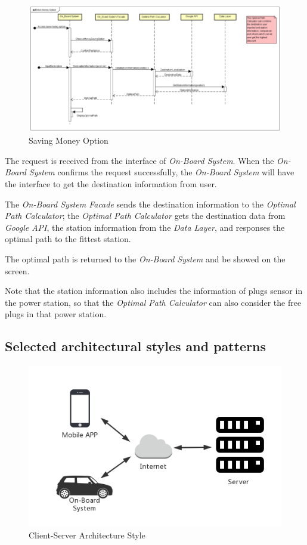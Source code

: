 \documentclass[a4paper,11pt]{article}
\begin{document}
		\begin{figure}[H]
   			\centering
   			\includegraphics[width=\textwidth]{images/saving_money}
  	    		\caption{Saving Money Option}\label{fig-saving}
		\end{figure}
The request is received from the interface of \textsl{On-Board System}. When the \textsl{On-Board System} confirms the request successfully, the \textsl{On-Board System} will have the interface to get the destination information from user.

The \textsl{On-Board System Facade} sends the destination information to the \textsl{Optimal Path Calculator}; the \textsl{Optimal Path Calculator} gets the destination data from \textsl{Google API}, the station information from the \textsl{Data Layer}, and responses the optimal path to the fittest station.

The optimal path is returned to the \textsl{On-Board System} and be showed on the screen.

Note that the station information also includes the information of plugs sensor in the power station, so that the \textsl{Optimal Path Calculator} can also consider the free plugs in that power station.
		
	\subsection{Selected architectural styles and patterns}
		\begin{figure}[H]
   			\centering
   			\includegraphics[width=\textwidth]{images/Client_Server}
  	    		\caption{Client-Server Architecture Style}\label{fig-style}
		\end{figure}
		
\end{document}
